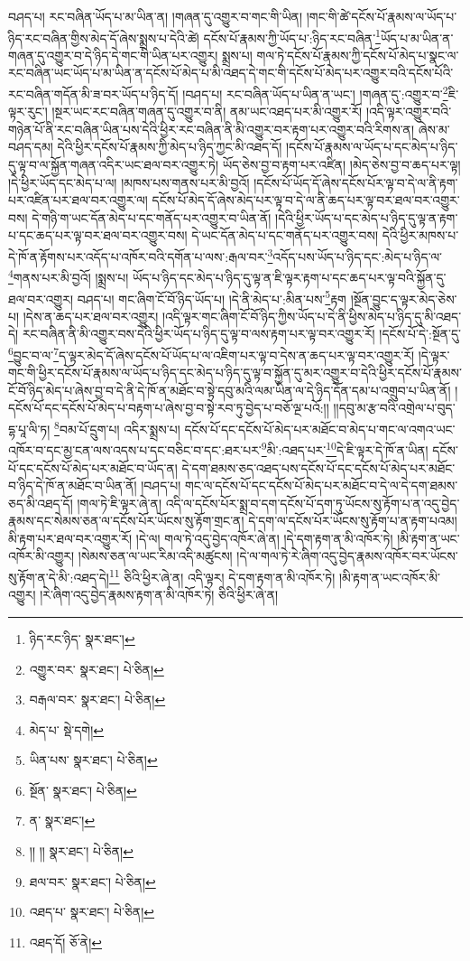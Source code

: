བཤད་པ། རང་བཞིན་ཡོད་པ་མ་ཡིན་ན། །གཞན་དུ་འགྱུར་བ་གང་གི་ཡིན། །གང་གི་ཚེ་དངོས་པོ་རྣམས་ལ་ཡོད་པ་ཉིད་རང་བཞིན་གྱིས་མེད་དོ་ཞེས་སྨྲས་པ་དེའི་ཚེ། དངོས་པོ་རྣམས་ཀྱི་ཡོད་པ་:ཉིད་རང་བཞིན་\footnote{ཉིད་རང་ཉིད་  སྣར་ཐང་། }ཡོད་པ་མ་ཡིན་ན་གཞན་དུ་འགྱུར་བ་དེ་ཉིད་དེ་གང་གི་ཡིན་པར་འགྱུར། སྨྲས་པ། གལ་ཏེ་དངོས་པོ་རྣམས་ཀྱི་དངོས་པོ་མེད་པ་སྣང་ལ་རང་བཞིན་ཡང་ཡོད་པ་མ་ཡིན་ན་དངོས་པོ་མེད་པ་མི་འཐད་དེ་གང་གི་དངོས་པོ་མེད་པར་འགྱུར་བའི་དངོས་པོའི་རང་བཞིན་གདོན་མི་ཟ་བར་ཡོད་པ་ཉིད་དོ། །བཤད་པ། རང་བཞིན་ཡོད་པ་ཡིན་ན་ཡང་། །གཞན་དུ་:འགྱུར་བ་\footnote{འགྱུར་བར་  སྣར་ཐང་།  པེ་ཅིན། }ཇི་ལྟར་རུང་། །སྔར་ཡང་རང་བཞིན་གཞན་དུ་འགྱུར་བ་ནི། ནམ་ཡང་འཐད་པར་མི་འགྱུར་རོ། །འདི་ལྟར་འགྱུར་བའི་གཉེན་པོ་ནི་རང་བཞིན་ཡིན་པས་དེའི་ཕྱིར་རང་བཞིན་ནི་མི་འགྱུར་བར་རྟག་པར་འགྱུར་བའི་རིགས་ན། ཞེས་མ་བཤད་དམ། དེའི་ཕྱིར་དངོས་པོ་རྣམས་ཀྱི་མེད་པ་ཉིད་ཀྱང་མི་འཐད་དོ། །དངོས་པོ་རྣམས་ལ་ཡོད་པ་དང་མེད་པ་ཉིད་དུ་ལྟ་བ་ལ་སྐྱོན་གཞན་འདིར་ཡང་ཐལ་བར་འགྱུར་ཏེ། ཡོད་ཅེས་བྱ་བ་རྟག་པར་འཛིན། །མེད་ཅེས་བྱ་བ་ཆད་པར་ལྟ། །དེ་ཕྱིར་ཡོད་དང་མེད་པ་ལ། །མཁས་པས་གནས་པར་མི་བྱའོ། །དངོས་པོ་ཡོད་དོ་ཞེས་དངོས་པོར་ལྟ་བ་དེ་ལ་ནི་རྟག་པར་འཛིན་པར་ཐལ་བར་འགྱུར་ལ། དངོས་པོ་མེད་དོ་ཞེས་མེད་པར་ལྟ་བ་དེ་ལ་ནི་ཆད་པར་ལྟ་བར་ཐལ་བར་འགྱུར་བས། དེ་གཉི་ག་ཡང་དོན་མེད་པ་དང་གནོད་པར་འགྱུར་བ་ཡིན་ནོ། །དེའི་ཕྱིར་ཡོད་པ་དང་མེད་པ་ཉིད་དུ་ལྟ་ན་རྟག་པ་དང་ཆད་པར་ལྟ་བར་ཐལ་བར་འགྱུར་བས། དེ་ཡང་དོན་མེད་པ་དང་གནོད་པར་འགྱུར་བས། དེའི་ཕྱིར་མཁས་པ་དེ་ཁོ་ན་རྟོགས་པར་འདོད་པ་འཁོར་བའི་དགོན་པ་ལས་:རྒལ་བར་\footnote{བརྒལ་བར་  སྣར་ཐང་།  པེ་ཅིན། }འདོད་པས་ཡོད་པ་ཉིད་དང་:མེད་པ་ཉིད་ལ་\footnote{མེད་པ་  སྡེ་དགེ། }གནས་པར་མི་བྱའོ། །སྨྲས་པ། ཡོད་པ་ཉིད་དང་མེད་པ་ཉིད་དུ་ལྟ་ན་ཇི་ལྟར་རྟག་པ་དང་ཆད་པར་ལྟ་བའི་སྐྱོན་དུ་ཐལ་བར་འགྱུར། བཤད་པ། གང་ཞིག་ངོ་བོ་ཉིད་ཡོད་པ། །དེ་ནི་མེད་པ་:མིན་པས་\footnote{ཡིན་པས་  སྣར་ཐང་།  པེ་ཅིན། }རྟག །སྔོན་བྱུང་ད་ལྟར་མེད་ཅེས་པ། །དེས་ན་ཆད་པར་ཐལ་བར་འགྱུར། །འདི་ལྟར་གང་ཞིག་ངོ་བོ་ཉིད་ཀྱིས་ཡོད་པ་དེ་ནི་ཕྱིས་མེད་པ་ཉིད་དུ་མི་འཐད་དེ། རང་བཞིན་ནི་མི་འགྱུར་བས་དེའི་ཕྱིར་ཡོད་པ་ཉིད་དུ་ལྟ་བ་ལས་རྟག་པར་ལྟ་བར་འགྱུར་རོ། །དངོས་པོ་དེ་:སྔོན་དུ་\footnote{སྔོན་  སྣར་ཐང་།  པེ་ཅིན། }བྱུང་བ་ལ་\footnote{ན་  སྣར་ཐང་། }ད་ལྟར་མེད་དོ་ཞེས་དངོས་པོ་ཡོད་པ་ལ་འཇིག་པར་ལྟ་བ་དེས་ན་ཆད་པར་ལྟ་བར་འགྱུར་རོ། །དེ་ལྟར་གང་གི་ཕྱིར་དངོས་པོ་རྣམས་ལ་ཡོད་པ་ཉིད་དང་མེད་པ་ཉིད་དུ་ལྟ་བ་སྐྱོན་དུ་མར་འགྱུར་བ་དེའི་ཕྱིར་དངོས་པོ་རྣམས་ངོ་བོ་ཉིད་མེད་པ་ཞེས་བྱ་བ་དེ་ནི་དེ་ཁོ་ན་མཐོང་བ་སྟེ་དབུ་མའི་ལམ་ཡིན་ལ་དེ་ཉིད་དོན་དམ་པ་འགྲུབ་པ་ཡིན་ནོ། །དངོས་པོ་དང་དངོས་པོ་མེད་པ་བརྟག་པ་ཞེས་བྱ་བ་སྟེ་རབ་ཏུ་བྱེད་པ་བཅོ་ལྔ་པའོ:།། །།དབུ་མ་རྩ་བའི་འགྲེལ་པ་བུད་དྷ་པཱ་ལི་ཏ། \footnote{།། །།   སྣར་ཐང་།  པེ་ཅིན། }བམ་པོ་དྲུག་པ། འདིར་སྨྲས་པ། དངོས་པོ་དང་དངོས་པོ་མེད་པར་མཐོང་བ་མེད་པ་གང་ལ་འགའ་ཡང་འཁོར་བ་དང་མྱ་ངན་ལས་འདས་པ་དང་བཅིང་བ་དང་:ཐར་པར་\footnote{ཐལ་བར་  སྣར་ཐང་།  པེ་ཅིན། }མི་:འཐད་པར་\footnote{འཐད་པ་  སྣར་ཐང་།  པེ་ཅིན། }དེ་ཇི་ལྟར་དེ་ཁོ་ན་ཡིན། དངོས་པོ་དང་དངོས་པོ་མེད་པར་མཐོང་བ་ཡོད་ན། དེ་དག་ཐམས་ཅད་འཐད་པས་དངོས་པོ་དང་དངོས་པོ་མེད་པར་མཐོང་བ་ཉིད་དེ་ཁོ་ན་མཐོང་བ་ཡིན་ནོ། །བཤད་པ། གང་ལ་དངོས་པོ་དང་དངོས་པོ་མེད་པར་མཐོང་བ་དེ་ལ་དེ་དག་ཐམས་ཅད་མི་འཐད་དོ། །གལ་ཏེ་ཇི་ལྟར་ཞེ་ན། འདི་ལ་དངོས་པོར་སྨྲ་བ་དག་དངོས་པོ་དག་ཏུ་ཡོངས་སུ་རྟོག་པ་ན་འདུ་བྱེད་རྣམས་དང་སེམས་ཅན་ལ་དངོས་པོར་ཡོངས་སུ་རྟོག་གྲང་ན། དེ་དག་ལ་དངོས་པོར་ཡོངས་སུ་རྟོག་པ་ན་རྟག་པའམ། མི་རྟག་པར་ཐལ་བར་འགྱུར་རོ། །དེ་ལ། གལ་ཏེ་འདུ་བྱེད་འཁོར་ཞེ་ན། །དེ་དག་རྟག་ན་མི་འཁོར་ཏེ། །མི་རྟག་ན་ཡང་འཁོར་མི་འགྱུར། །སེམས་ཅན་ལ་ཡང་རིམ་འདི་མཚུངས། །དེ་ལ་གལ་ཏེ་རེ་ཞིག་འདུ་བྱེད་རྣམས་འཁོར་བར་ཡོངས་སུ་རྟོག་ན་དེ་མི་:འཐད་དེ།\footnote{འཐད་དོ།  ཅོ་ནེ། } ཅིའི་ཕྱིར་ཞེ་ན། འདི་ལྟར། དེ་དག་རྟག་ན་མི་འཁོར་ཏེ། །མི་རྟག་ན་ཡང་འཁོར་མི་འགྱུར། །རེ་ཞིག་འདུ་བྱེད་རྣམས་རྟག་ན་མི་འཁོར་ཏེ། ཅིའི་ཕྱིར་ཞེ་ན། 